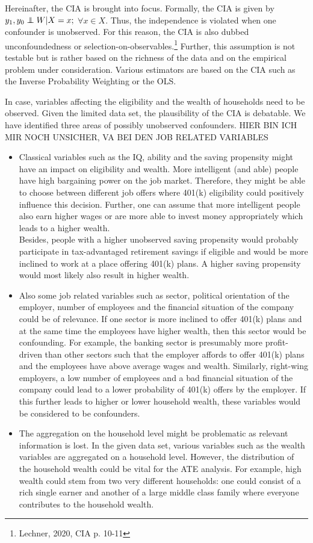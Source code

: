 \documentclass{article}
\newcommand\independent{\protect\mathpalette{\protect\independenT}{\perp}}
\def\independenT#1#2{\mathrel{\rlap{$#1#2$}\mkern2mu{#1#2}}}
\begin{document}
Hereinafter, the CIA is brought into focus.
Formally, the CIA is given by $y_1, y_0 \independent W|X=x; $ $ \forall x \in X $. Thus, the independence is violated when one confounder is unobserved. For this reason, the CIA is also dubbed unconfoundedness or selection-on-observables.\footnote{Lechner, 2020, CIA p. 10-11} Further, this assumption is not testable but is rather based on the richness of the data and on the empirical problem under consideration. 
Various estimators are based on the CIA such as the Inverse Probability Weighting or the OLS. \newline

In case, variables affecting the eligibility and the wealth  of households need to be observed. Given the limited data set, the plausibility of the CIA is debatable. We have identified three areas of possibly unobserved confounders.
HIER BIN ICH MIR NOCH UNSICHER, VA BEI DEN JOB RELATED VARIABLES
\begin{itemize}
    \item Classical variables such as the IQ, ability and the saving propensity might have an impact on eligibility and wealth.
    More intelligent (and able) people have high bargaining power on the job market. Therefore, they might be able to choose between different job offers where 401(k) eligibility could positively influence this decision. Further, one can assume that more intelligent people also earn higher wages or are more able to invest money appropriately which leads to a higher wealth. \\
    Besides, people with a higher unobserved saving propensity would probably participate in tax-advantaged retirement savings if eligible and would be more inclined to work at a place offering 401(k) plans. A higher saving propensity would most likely also result in higher wealth.
    \item Also some job related variables such as sector, political orientation of the employer, number of employees and the financial situation of the company could be of relevance. If one sector is more inclined to offer 401(k) plans and at the same time the employees have higher wealth, then this sector would be confounding. For example, the banking sector is presumably more profit-driven than other sectors such that the employer affords to offer 401(k) plans and the employees have above average wages and wealth. Similarly, right-wing employers, a low number of employees and a bad financial situation of the company could lead to a lower probability of 401(k) offers by the employer. If this further leads to higher or lower household wealth, these variables would be considered to be confounders.
    \item The aggregation on the household level might be problematic as relevant information is lost. In the given data set, various variables such as the wealth variables are aggregated on a household level. However, the distribution of the household wealth could be vital for the ATE analysis. For example, high wealth could stem from two very different households: one could consist of a rich single earner and another of a large middle class family where everyone contributes to the household wealth. 
\end{itemize}
\end{document}
